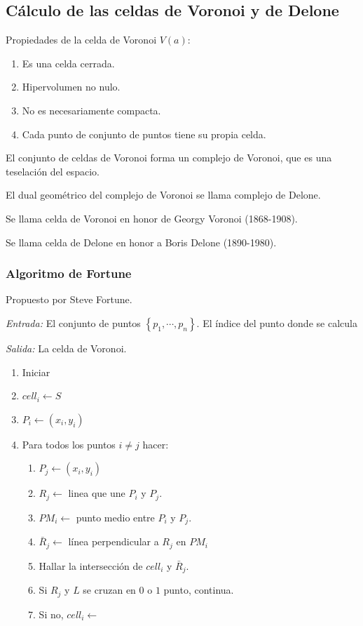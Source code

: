 \subsection{Cálculo de las celdas de Voronoi y de Delone}

Propiedades de la celda de Voronoi $V(a)$:

\begin{enumerate}
    \item Es una celda cerrada.
    \item Hipervolumen no nulo.
    \item No es necesariamente compacta.
    \item Cada punto de conjunto de puntos tiene su propia celda.
\end{enumerate}

El conjunto de celdas de Voronoi forma un complejo de Voronoi, que es una teselación del espacio.

El dual geométrico del complejo de Voronoi se llama complejo de Delone.

Se llama celda de Voronoi en honor de Georgy  Voronoi (1868-1908).

Se llama celda de Delone en honor a Boris Delone (1890-1980).


\subsubsection{Algoritmo de Fortune}

Propuesto por Steve Fortune. 

\textit{Entrada:} El conjunto de puntos $\left\{p_1,\cdots,p_n\right\}$. El índice del punto donde se calcula 

\textit{Salida:} La celda de Voronoi.

\begin{enumerate}
    \item Iniciar
    \item $cell_i\leftarrow S$
    \item $P_i\leftarrow (x_i,y_i)$
    \item Para todos los puntos $i\neq j$ hacer:
    \begin{enumerate}
        \item $P_j\leftarrow (x_i,y_i)$
        \item $R_j\leftarrow $ linea que une $P_i$ y $P_j$.
        \item $PM_i\leftarrow$ punto medio entre $P_i$ y $P_j$.
        \item $\bar{R}_j\leftarrow$ línea perpendicular a $R_j$ en $PM_i$
        \item Hallar la intersección de $cell_i$ y $\bar{R}_j$.
        \item Si $R_j$ y $L$ se cruzan en $0$ o $1$ punto, continua.
        \item Si no, $cell_i\leftarrow$
    \end{enumerate}
\end{enumerate}
